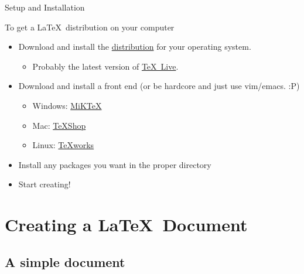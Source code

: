 \documentclass[]{beamer}
\begin{document}
\begin{frame}{Setup and Installation}
	\begin{block}{To get a \LaTeX~distribution on your computer}
		\begin{itemize}
    			\item Download and install the \href{http://www.latex-project.org/ftp.html}{distribution} for your operating system.
				\begin{itemize} \item Probably the latest version of \href{http://www.tug.org/texlive/}{\TeX~Live}.\end{itemize}
			\item Download and install a front end (or be hardcore and just use vim/emacs. :P)
				\begin{itemize}
					\item Windows: \href{http://miktex.org/}{MiKTeX}
					\item Mac: \href{http://pages.uoregon.edu/koch/texshop/}{TeXShop}
					\item Linux: \href{http://www.tug.org/texworks/}{TeXworks}
				\end{itemize}
			\item Install any packages you want in the proper directory
			\item Start creating!
    		\end{itemize}
	\end{block}
\end{frame}
\section{Creating a \LaTeX~Document}

\subsection*{A simple document}
\end{document}
